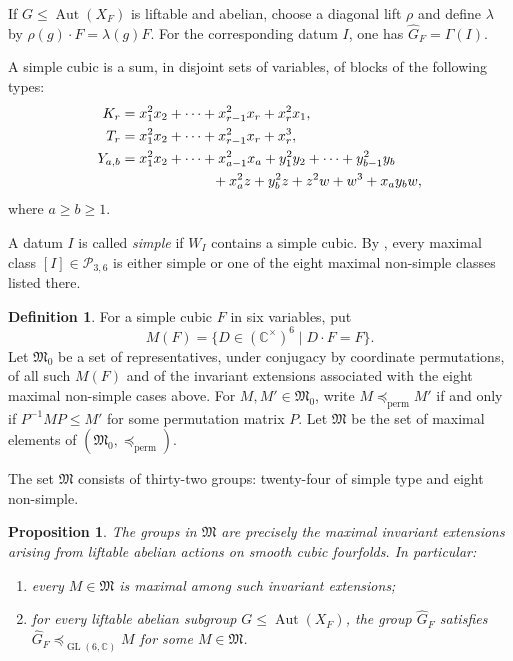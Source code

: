 \documentclass[12pt]{amsart}
\numberwithin{equation}{section}
\theoremstyle{plain}
\newtheorem{prop}[thm]{Proposition}
\theoremstyle{definition}
\newtheorem{defn}[thm]{Definition}
\theoremstyle{remark}
\newcommand{\CC}{\mathbb C}
\DeclareMathOperator{\Aut}{Aut}
\DeclareMathOperator{\GL}{GL}
\begin{document}
If $G\leq\Aut(X_F)$ is liftable and abelian, choose a diagonal lift $\rho$
and define $\lambda$ by $\rho(g)\cdot F=\lambda(g)F$.  For the corresponding
datum $I$, one has $\widehat G_F=\Gamma(I)$.

A simple cubic is a sum, in disjoint sets of variables, of blocks of the
following types:
\begin{align*}
K_r&=x_1^2x_2+\cdots+x_{r-1}^2x_r+x_r^2x_1,\\
T_r&=x_1^2x_2+\cdots+x_{r-1}^2x_r+x_r^3,\\
Y_{a,b}&=x_1^2x_2+\cdots+x_{a-1}^2x_a
+y_1^2y_2+\cdots+y_{b-1}^2y_b\\
&\hspace{2.3cm}+x_a^2z+y_b^2z+z^2w+w^3+x_ay_bw,
\end{align*}
where $a\geq b\geq1$.

A datum $I$ is called \emph{simple} if $W_I$ contains a simple cubic.  By
\cite[Theorem~4.2(1)--(8)]{zheng2021liftableabelian}, every maximal class
$[I]\in\mathcal P_{3,6}$ is either simple or one of the eight maximal non-simple
classes listed there.

\begin{defn}\label{def:maximal-liftable-abelian-sets}
For a simple cubic $F$ in six variables, put
\[
M(F)=\{D\in(\CC^\times)^6\mid D\cdot F=F\}.
\]
Let $\mathfrak M_0$ be a set of representatives, under conjugacy by
coordinate permutations, of all such $M(F)$ and of the invariant extensions
associated with the eight maximal non-simple cases above.  For
$M,M'\in\mathfrak M_0$, write $M\preceq_{\mathrm{perm}}M'$ if and only if
$P^{-1}MP\leq M'$ for some permutation matrix $P$.
Let $\mathfrak M$ be the set of maximal elements of
$(\mathfrak M_0,\preceq_{\mathrm{perm}})$.
\end{defn}

The set $\mathfrak M$ consists of thirty-two groups: twenty-four of simple
type and eight non-simple.

\begin{prop}\label{prop:maximal-liftable-abelian-groups}
The groups in $\mathfrak M$ are precisely the maximal invariant extensions
arising from liftable abelian actions on smooth cubic fourfolds.  In
particular:
\begin{enumerate}
    \item every $M\in\mathfrak M$ is maximal among such invariant extensions;
    \item for every liftable abelian subgroup
    $G\leq\Aut(X_F)$, the group $\widehat G_F$ satisfies
    $\widehat G_F\preceq_{\GL(6,\CC)}M$ for some $M\in\mathfrak M$.
\end{enumerate}
\end{prop}
\end{document}
